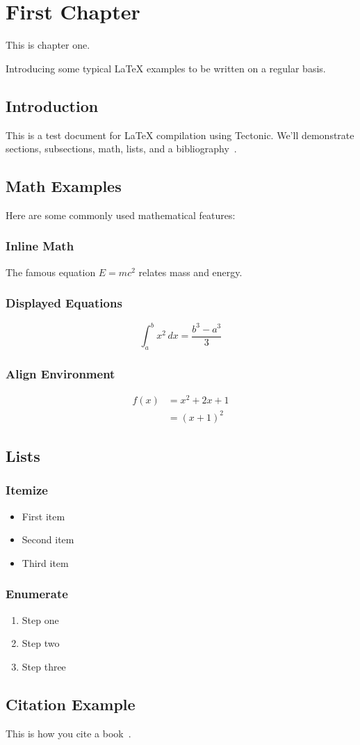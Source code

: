 \chapter{First Chapter}
This is chapter one. 

Introducing some typical LaTeX examples to be written on a regular basis.


\section{Introduction}
This is a test document for \LaTeX{} compilation using Tectonic. We'll demonstrate sections, subsections, math, lists, and a bibliography~\cite{knuth1984texbook}.

\section{Math Examples}
Here are some commonly used mathematical features:

\subsection{Inline Math}
The famous equation $E=mc^2$ relates mass and energy.

\subsection{Displayed Equations}
\begin{equation}
    \int_{a}^{b} x^2 \, dx = \frac{b^3 - a^3}{3}
\end{equation}

\subsection{Align Environment}
\begin{align}
    f(x) &= x^2 + 2x + 1 \\
         &= (x+1)^2
\end{align}

\section{Lists}

\subsection{Itemize}
\begin{itemize}
    \item First item
    \item Second item
    \item Third item
\end{itemize}

\subsection{Enumerate}
\begin{enumerate}
    \item Step one
    \item Step two
    \item Step three
\end{enumerate}

\section{Citation Example}
This is how you cite a book~\cite{knuth1984texbook}.
